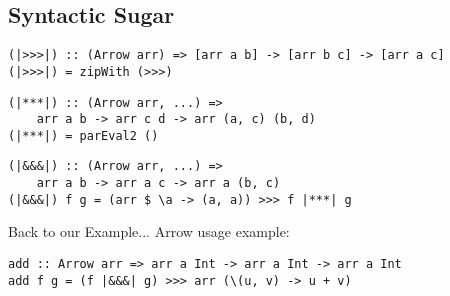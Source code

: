 \subsection{Syntactic Sugar}
\begin{frame}[fragile]
\begin{lstlisting}[frame=htrbl]
(|>>>|) :: (Arrow arr) => [arr a b] -> [arr b c] -> [arr a c]
(|>>>|) = zipWith (>>>)
\end{lstlisting}

\begin{lstlisting}[frame=htrbl]
(|***|) :: (Arrow arr, ...) =>
	arr a b -> arr c d -> arr (a, c) (b, d)
(|***|) = parEval2 ()
\end{lstlisting}

\begin{lstlisting}[frame=htrbl]
(|&&&|) :: (Arrow arr, ...) =>
	arr a b -> arr a c -> arr a (b, c)
(|&&&|) f g = (arr $ \a -> (a, a)) >>> f |***| g
\end{lstlisting}
\end{frame}

\begin{frame}[fragile]{Back to our Example...}
Arrow usage example:
\begin{lstlisting}[frame=htrbl]
add :: Arrow arr => arr a Int -> arr a Int -> arr a Int
add f g = (f |&&&| g) >>> arr (\(u, v) -> u + v)
\end{lstlisting}
\end{frame}